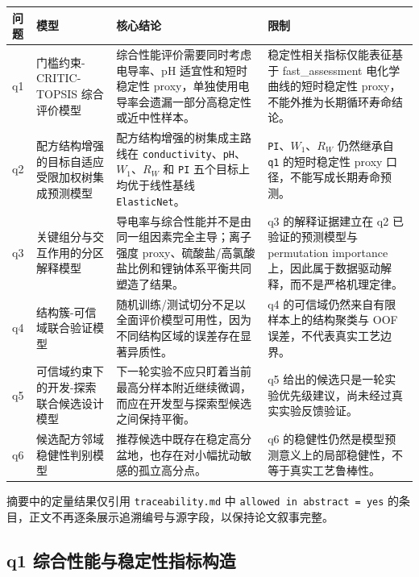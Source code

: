 \documentclass[bwprint]{gmcmthesis}
\numberwithin{figure}{section}
\begin{document}
\begin{table}[htbp]
\centering
\small
\begin{tabularx}{\textwidth}{>{\raggedright\arraybackslash}X>{\raggedright\arraybackslash}X>{\raggedright\arraybackslash}X>{\raggedright\arraybackslash}X}
\toprule
问题 & 模型 & 核心结论 & 限制 \\
\midrule
q1 & 门槛约束-CRITIC-TOPSIS 综合评价模型 & 综合性能评价需要同时考虑电导率、pH 适宜性和短时稳定性 proxy，单独使用电导率会遗漏一部分高稳定性或近中性样本。 & 稳定性相关指标仅能表征基于 fast\_assessment 电化学曲线的短时稳定性 proxy，不能外推为长期循环寿命结论。 \\
q2 & 配方结构增强的目标自适应受限加权树集成预测模型 & 配方结构增强的树集成主路线在 \texttt{conductivity}、\texttt{pH}、$W_1$、$R_W$ 和 \texttt{PI} 五个目标上均优于线性基线 \texttt{ElasticNet}。 & \texttt{PI}、$W_1$、$R_W$ 仍然继承自 \texttt{q1} 的短时稳定性 proxy 口径，不能写成长期寿命预测。 \\
q3 & 关键组分与交互作用的分区解释模型 & 导电率与综合性能并不是由同一组因素完全主导；离子强度 proxy、硫酸盐/高氯酸盐比例和锂钠体系平衡共同塑造了结果。 & q3 的解释证据建立在 q2 已验证的预测模型与 permutation importance 上，因此属于数据驱动解释，而不是严格机理定律。 \\
q4 & 结构簇-可信域联合验证模型 & 随机训练/测试切分不足以全面评价模型可用性，因为不同结构区域的误差存在显著异质性。 & q4 的可信域仍然来自有限样本上的结构聚类与 OOF 误差，不代表真实工艺边界。 \\
q5 & 可信域约束下的开发-探索联合候选设计模型 & 下一轮实验不应只盯着当前最高分样本附近继续微调，而应在开发型与探索型候选之间保持平衡。 & q5 给出的候选只是一轮实验优先级建议，尚未经过真实实验反馈验证。 \\
q6 & 候选配方邻域稳健性判别模型 & 推荐候选中既存在稳定高分盆地，也存在对小幅扰动敏感的孤立高分点。 & q6 的稳健性仍然是模型预测意义上的局部稳健性，不等于真实工艺鲁棒性。 \\
\bottomrule
\end{tabularx}
\end{table}

摘要中的定量结果仅引用 \texttt{traceability.md} 中 \texttt{allowed in abstract = yes} 的条目，正文不再逐条展示追溯编号与源字段，以保持论文叙事完整。\par

\subsection{q1 综合性能与稳定性指标构造}
\end{document}
